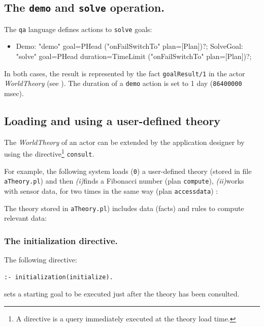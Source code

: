 \subsection{The \texttt{demo} and \texttt{solve} operation.}

The \texttt{qa} language defines actions to \texttt{solve} \prolog{} goals: 
 
\begin{itemize}
\item
\begin{javacode}  
Demo:	"demo" goal=PHead ("onFailSwitchTo" plan=[Plan])?;
SolveGoal:	"solve" goal=PHead duration=TimeLimit ("onFailSwitchTo" plan=[Plan])?;
\end{javacode}
\end{itemize}

In both cases, the result is represented by the fact \texttt{goalResult/1} in the actor \textit{WorldTheory} (see ). The duration of a \texttt{demo} action is set to 1 day (\texttt{86400000} msec).

\subsection{Loading and using a user-defined theory}
The \textit{WorldTheory} of an actor can be extended by the application designer by using the directive\footnote{A \tuprolog{} directive is a query immediately executed at the theory load time.} \texttt{consult}. 

For example, the following system loads (\texttt{0}) a user-defined theory (stored in file \texttt{aTheory.pl}) and then \textit{(i)}finds a Fibonacci number (plan \texttt{compute}), \textit{(ii)}works with sensor data, for two times in the same way (plan \texttt{accessdata}) :

  

The theory stored in \texttt{aTheory.pl}) includes data (facts) and rules to compute relevant data:
  

\subsubsection{The initialization directive.}
The following directive:
\medskip 
\begin{Verbatim}[fontsize=\scriptsize, frame=single]
:- initialization(initialize).  
\end{Verbatim}
sets a starting goal to be executed just after the theory has been consulted. 

